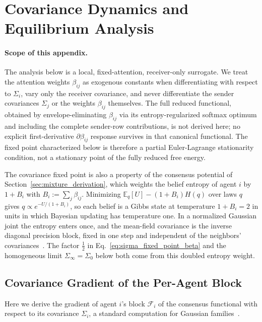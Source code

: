\documentclass[11pt]{article}
\begin{document}
\section{Covariance Dynamics and Equilibrium Analysis}
\label{app:covariance_dynamics}

\paragraph{Scope of this appendix.}
The analysis below is a local, fixed-attention, receiver-only surrogate. We treat the attention weights $\beta_{ij}$ as exogenous constants when differentiating with respect to $\Sigma_i$, vary only the receiver covariance, and never differentiate the sender covariances $\Sigma_j$ or the weights $\beta_{ij}$ themselves. The full reduced functional, obtained by envelope-eliminating $\beta_{ij}$ via its entropy-regularized softmax optimum and including the complete sender-row contributions, is not derived here; no explicit first-derivative $\partial\beta_{ij}$ response survives in that canonical functional. The fixed point characterized below is therefore a partial Euler-Lagrange stationarity condition, not a stationary point of the fully reduced free energy.

The covariance fixed point is also a property of the consensus potential of Section~\ref{sec:mixture_derivation}, which weights the belief entropy of agent $i$ by $1+B_i$ with $B_i := \sum_j\beta_{ij}$. Minimizing $\mathbb{E}_{q}[U] - (1+B_i)H(q)$ over laws $q$ gives $q \propto e^{-U/(1+B_i)}$, so each belief is a Gibbs state at temperature $1+B_i = 2$ in units in which Bayesian updating has temperature one. In a normalized Gaussian joint the entropy enters once, and the mean-field covariance is the inverse diagonal precision block, fixed in one step and independent of the neighbors' covariances~\cite[Ch.~G4, block optimum]{DennisGaugeVFESuppG2026}. The factor $\tfrac{1}{2}$ in Eq.~\eqref{eq:sigma_fixed_point_beta} and the homogeneous limit $\Sigma_\infty = \Sigma_0$ below both come from this doubled entropy weight.

\subsection{Covariance Gradient of the Per-Agent Block}

Here we derive the gradient of agent $i$'s block $\mathcal{F}_i$ of the consensus functional with respect to its covariance $\Sigma_i$, a standard computation for Gaussian families~\cite{Amari2016, petersen2012matrix}.
\end{document}

